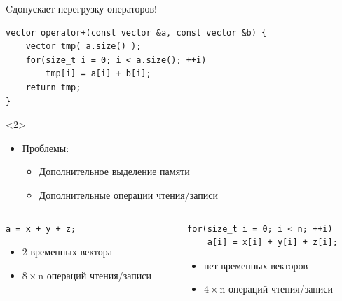 \documentclass[@BEAMER_OPTIONS@]{beamer}
\newcommand{\CXX}{{\rm C}\plusplus}
\begin{document}
\note{ }

\begin{frame}[fragile]{\CXX допускает перегрузку операторов!}
    \begin{exampleblock}{}
        \begin{lstlisting}
vector operator+(const vector &a, const vector &b) {
    vector tmp( a.size() );
    for(size_t i = 0; i < a.size(); ++i)
        tmp[i] = a[i] + b[i];
    return tmp;
}
        \end{lstlisting}
    \end{exampleblock}
    \begin{uncoverenv}<2>
        \begin{itemize}
            \item Проблемы:
                \begin{itemize}
                    \item Дополнительное выделение памяти
                    \item Дополнительные операции чтения/записи
                \end{itemize}
        \end{itemize}
        \begin{columns}
            \begin{column}{0.45\textwidth}
                \begin{exampleblock}{}
                    \begin{lstlisting}[aboveskip=0.4\baselineskip,belowskip=0.4\baselineskip]
a = x + y + z;

                    \end{lstlisting}
                \end{exampleblock}
                \begin{itemize}
                    \item 2 временных вектора
                    \item $8 \times \text{n}$ операций чтения/записи
                \end{itemize}
            \end{column}
            \begin{column}{0.45\textwidth}
                \begin{exampleblock}{}
                    \begin{lstlisting}
for(size_t i = 0; i < n; ++i)
    a[i] = x[i] + y[i] + z[i];
                    \end{lstlisting}
                \end{exampleblock}
                \begin{itemize}
                    \item нет временных векторов
                    \item $4 \times \text{n}$ операций чтения/записи
                \end{itemize}
            \end{column}
        \end{columns}
    \end{uncoverenv}
\end{frame}
\end{document}
